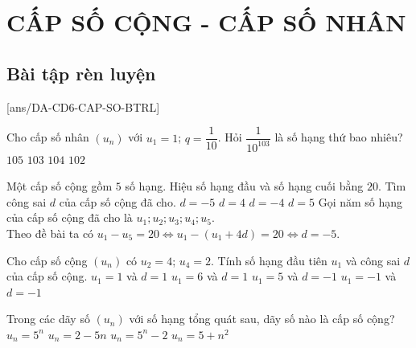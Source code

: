 \setcounter{ex}{0}
\section{CẤP SỐ CỘNG - CẤP SỐ NHÂN}
\subsection{Bài tập rèn luyện}
[ans/DA-CD6-CAP-SO-BTRL]
\begin{ex}%
 Cho cấp số nhân $(u_n)$ với $u_1=1$; $q=\dfrac{1}{10}$. Hỏi $\dfrac{1}{10^{103}}$ là số hạng thứ bao nhiêu?
 \choice
 {$105$}
 {$103$}
 {\True $104$}
 {$102$}
\end{ex}
\begin{ex}%
 Một cấp số cộng gồm $5$ số hạng. Hiệu số hạng đầu và số hạng cuối bằng $20$. Tìm công sai $d$ của cấp số cộng đã cho.
 \choice
 {\True $d=-5$}
 {$d=4$}
 {$d=-4$}
 {$d=5$}
 \loigiai
 {
 Gọi năm số hạng của cấp số cộng đã cho là $u_1; u_2; u_3; u_4; u_5$.\\
 Theo đề bài ta có $u_1 - u_5 = 20 \Leftrightarrow u_1 - \left(u_1+4d\right)=20\Leftrightarrow d=-5$.
 }
\end{ex}
\begin{ex}%
 Cho cấp số cộng $\left(u_n \right)$ có $u_2=4$; $u_4=2$. Tính số hạng đầu tiên $u_1$ và công sai $d$ của cấp số cộng.
 \choice
 {$u_1=1$ và $d=1$}
 {$u_1=6$ và $d=1$}
 {\True $u_1=5$ và $d=-1$}
 {$u_1=-1$ và $d=-1$}
\end{ex}
\begin{ex}%
 Trong các dãy số $(u_n)$ với số hạng tổng quát sau, dãy số nào là cấp số cộng?
 \choice
 {$u_n=5^n$}
 {\True $u_n=2-5n$}
 {$u_n=5^n-2$}
 {$u_n=5+n^2$}
\end{ex}
